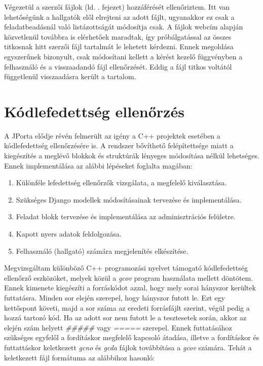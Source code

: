 Végezetül a szerzői fájlok (ld. . fejezet) hozzáférését ellenőriztem. Itt van lehetőségünk a hallgatók elől elrejteni az adott fájlt, ugyanakkor ez csak a feladatbeadásnál való listázottságát módosítja csak. A fájlok webcím alapján közvetlenül továbbra is elérhetőek maradtak, így próbálgatással az összes titkosnak hitt szerzői fájl tartalmát le lehetett kérdezni. Ennek megoldása egyszerűnek bizonyult, csak módosítani kellett a kérést kezelő függvényben a felhasználó és a visszaadandó fájl ellenőrzését. Eddig a fájl titkos voltától függetlenül visszaadásra került a tartalom.

\section{Kódlefedettség ellenőrzés}

A JPorta elődje révén felmerült az igény a C++ projektek esetében a kódlefedettség ellenőrzésére is. A rendszer bővíthető felépítettsége miatt a kiegészítés a meglévő blokkok és struktúrák lényeges módosítása nélkül lehetséges. Ennek implementálása az alábbi lépéseket foglalta magában:

\begin{enumerate}
    \item Különféle lefedettség ellenőrzők vizsgálata, a megfelelő kiválasztása.
    \item Szükséges Django modellek módosításainak tervezése és implementálása.
    \item Feladat blokk tervezése és implementálása az adminisztrációs felületre.
    \item Kapott nyers adatok feldolgozása.
    \item Felhasználó (hallgató) számára megjelenítés elkészítése.
\end{enumerate}

Megvizsgáltam különböző C++ programozási nyelvet támogató kódlefedettség ellenőrző eszközöket, melyek közül a \textit{gcov} program használata mellett döntötem. Ennek kimenete kiegészíti a forráskódot azzal, hogy mely sorai hányszor kerültek futtatásra. Minden sor elején szerepel, hogy hányszor futott le. Ezt egy kettőspont követi, majd a sor száma az eredeti forrásfájlt szerint, végül pedig a hozzá tartozó kód. Ha az adott sor nem futott le a tesztesetek során, akkor az elején szám helyett \textit{\#\#\#\#\#} vagy \textit{=====} szerepel. Ennek futtatásához szükséges egyfelől a fordításkor megfelelő kapcsoló átadása, illetve a fordításkor és futtattáskor keletkezett \textit{gcno} és \textit{gcda} fájlok továbbítása a \textit{gcov} számára. Tehát a keletkezett fájl formátuma az alábbihoz hasonló:

